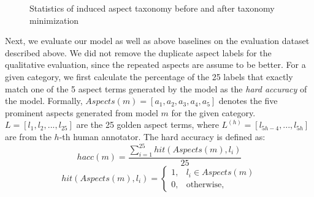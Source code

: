 \documentclass[11pt,a4paper]{article}
\begin{document}
\begin{figure}[!ht]%
	\centering
	\qquad
	\caption{Statistics of induced aspect taxonomy before and after taxonomy minimization}
	\label{fig:size}
\end{figure}


Next, we evaluate our model as well as above baselines on the evaluation dataset described above.
We did not remove the duplicate aspect labels for the qualitative evaluation, 
since the repeated aspects are assume to be better.
For a given category, we first calculate the percentage of the 25 labels that exactly match one of the 5 aspect terms generated by the model 
as the \textit{hard accuracy} 
of the model. 
Formally, $Aspects(m) = [a_1, a_2, a_3, a_4, a_5]$ denotes 
the five prominent aspects generated from model $m$ for 
the given category.
$L = [l_1, l_2, ..., l_{25}]$ are the 25 golden aspect terms,
where $L^{(h)}= [l_{5h-4}, ..., l_{5h}]$ are from the $h$-th human annotator.
The hard accuracy is defined as:
\begin{equation}
hacc(m) = \frac{\sum_{i=1}^{25}{hit(Aspects(m), l_i)}}{25}
\end{equation}
\begin{equation}
hit(Aspects(m), l_i) = 
\begin{cases}
1, & l_i \in Aspects(m) \\
0, & \text{otherwise, }
\end{cases}
\end{equation}
\end{document}
